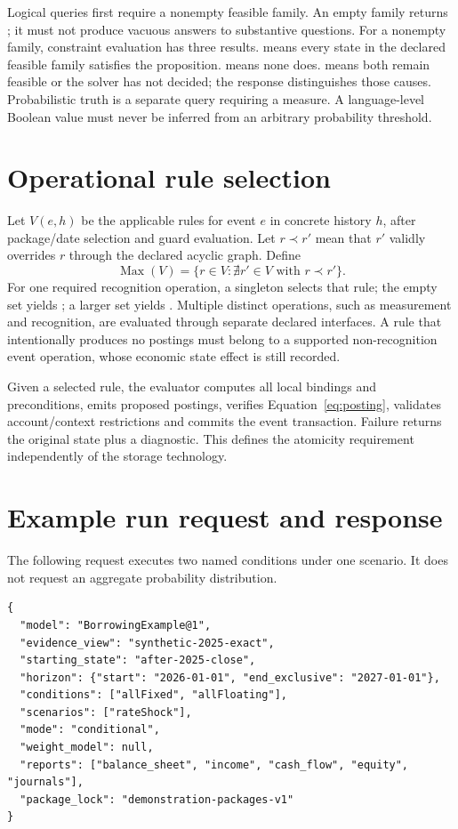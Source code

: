 Logical queries first require a nonempty feasible family. An empty family
returns ; it must not produce vacuous answers to substantive
questions. For a nonempty family, constraint evaluation has three results.
 means every state in
the declared feasible family satisfies the proposition.  means
none does.  means both remain feasible or the solver has
not decided; the response distinguishes those causes. Probabilistic truth is
a separate query requiring a measure. A language-level Boolean value must
never be inferred from an arbitrary probability threshold.

\section{Operational rule selection}

Let $V(e,h)$ be the applicable rules for event $e$ in concrete history $h$,
after package/date selection and guard evaluation. Let $r\prec r'$ mean that
$r'$ validly overrides $r$ through the declared acyclic graph. Define
\[
 \operatorname{Max}(V)=\{r\in V:\nexists r'\in V\text{ with }r\prec r'\}.
\]
For one required recognition operation, a singleton selects that rule; the
empty set yields ; a larger set yields
. Multiple distinct operations, such as measurement and
recognition, are evaluated through separate declared interfaces. A rule that
intentionally produces no postings must belong to a supported non-recognition
event operation, whose economic state effect is still recorded.

Given a selected rule, the evaluator computes all local bindings and
preconditions, emits proposed postings, verifies
Equation~\eqref{eq:posting}, validates account/context restrictions and commits
the event transaction. Failure returns the original state plus a diagnostic.
This defines the atomicity requirement independently of the storage technology.

\begin{minipage}{\linewidth}
\section{Example run request and response}

The following request executes two named conditions under one scenario. It
does not request an aggregate probability distribution.

\begin{lstlisting}
{
  "model": "BorrowingExample@1",
  "evidence_view": "synthetic-2025-exact",
  "starting_state": "after-2025-close",
  "horizon": {"start": "2026-01-01", "end_exclusive": "2027-01-01"},
  "conditions": ["allFixed", "allFloating"],
  "scenarios": ["rateShock"],
  "mode": "conditional",
  "weight_model": null,
  "reports": ["balance_sheet", "income", "cash_flow", "equity", "journals"],
  "package_lock": "demonstration-packages-v1"
}
\end{lstlisting}
\end{minipage}

